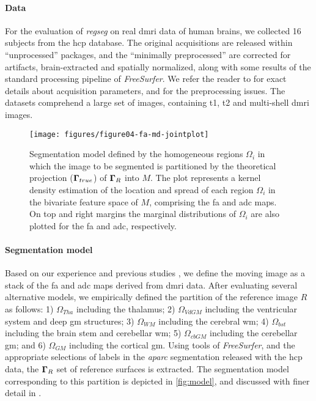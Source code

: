 \paragraph*{Data}
For the evaluation of \emph{regseg} on real \gls*{dmri} data of human brains,
  we collected 16 subjects from the \gls*{hcp} database.
The original acquisitions are released within ``unprocessed'' packages, and
  the ``minimally preprocessed'' are corrected for artifacts, brain-extracted
  and spatially normalized, along with some results of the standard processing
  pipeline of \emph{FreeSurfer}.
We refer the reader to \citep{essen_human_2012} for exact details about acquisition
  parameters, and \citep{glasser_minimal_2013} for the preprocessing issues.
The datasets comprehend a large set of images, containing \gls*{t1}, \gls*{t2} and
  multi-shell \gls*{dmri} images.

\begin{figure}
\texttt{[image: figures/figure04-fa-md-jointplot]}
\caption{Segmentation model defined by the homogeneous regions $\Omega_i$ in which
  the image to be segmented is partitioned by the theoretical projection 
  ($\boldsymbol{\Gamma}_{true}$) of $\boldsymbol{\Gamma}_R$ into $M$.
The plot represents a kernel density estimation of the location and spread of
  each region $\Omega_i$ in the bivariate feature space of $M$, comprising 
  the \gls*{fa} and \gls*{adc} maps.
On top and right margins the marginal distributions of $\Omega_i$ are also plotted for
  the \gls*{fa} and \gls*{adc}, respectively.
}\label{fig:model}
\end{figure}

\paragraph*{Segmentation model}
Based on our experience \citep{esteban_brain_2012} and previous studies \citep{ennis_orthogonal_2006},
  we define the moving image as a stack of the \gls*{fa} and \gls*{adc} maps derived
  from \gls*{dmri} data.
After evaluating several alternative models, we empirically defined the partition \omegaset{} 
  of the reference image $R$ as follows:
  1) $\Omega_{Tha}$ including the thalamus;
  2) $\Omega_{VdGM}$ including the ventricular system and deep \gls*{gm} structures;
  3) $\Omega_{WM}$ including the cerebral \gls*{wm};
  4) $\Omega_{bst}$ including the brain stem and cerebellar \gls*{wm};
	5) $\Omega_{cbGM}$ including the cerebellar \gls*{gm}; and
	6) $\Omega_{GM}$ including the cortical \gls*{gm}.
Using tools of \emph{FreeSurfer}, and the appropriate selections of labels in the 
  \emph{aparc} segmentation released with the \gls*{hcp} data, the $\boldsymbol{\Gamma}_R$ set of
  reference surfaces is extracted.
The segmentation model corresponding to this partition is depicted in \autoref{fig:model},
  and discussed with finer detail in .

